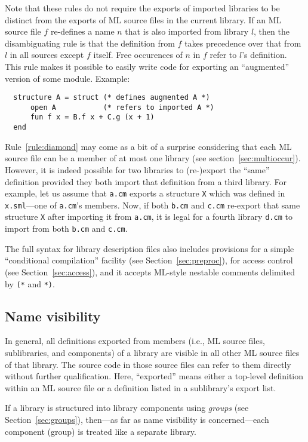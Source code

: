 \documentclass[titlepage,letterpaper]{article}
\begin{document}
Note that these rules do not require the exports of imported libraries
to be distinct from the exports of ML source files in the current
library.  If an ML source file $f$ re-defines a name $n$ that is also
imported from library $l$, then the disambiguating rule is that the
definition from $f$ takes precedence over that from $l$ in all sources
except $f$ itself.  Free occurences of $n$ in $f$ refer to $l$'s
definition.  This rule makes it possible to easily write code for
exporting an ``augmented'' version of some module.  Example:

\begin{verbatim}
  structure A = struct (* defines augmented A *)
      open A           (* refers to imported A *)
      fun f x = B.f x + C.g (x + 1)
  end
\end{verbatim}

Rule~\ref{rule:diamond} may come as a bit of a surprise considering
that each ML source file can be a member of at most one library (see
section~\ref{sec:multioccur}).  However, it is indeed possible for two
libraries to (re-)export the ``same'' definition provided they both
import that definition from a third library.  For example, let us
assume that {\tt a.cm} exports a structure {\tt X} which was defined
in {\tt x.sml}---one of {\tt a.cm}'s members.  Now, if both {\tt b.cm}
and {\tt c.cm} re-export that same structure {\tt X} after importing
it from {\tt a.cm}, it is legal for a fourth library {\tt d.cm} to
import from both {\tt b.cm} and {\tt c.cm}.

The full syntax for library description files also includes provisions
for a simple ``conditional compilation'' facility (see
Section~\ref{sec:preproc}), for access control (see
Section~\ref{sec:access}), and it accepts ML-style nestable comments
delimited by \verb|(*| and \verb|*)|.

\subsection{Name visibility}

In general, all definitions exported from members (i.e., ML source
files, sublibraries, and components) of a library are visible in all
other ML source files of that library.  The source code in those
source files can refer to them directly without further qualification.
Here, ``exported'' means either a top-level definition within an ML
source file or a definition listed in a sublibrary's export list.

If a library is structured into library components using {\em groups}
(see Section~\ref{sec:groups}), then---as far as name visibility is
concerned---each component (group) is treated like a separate library.
\end{document}
